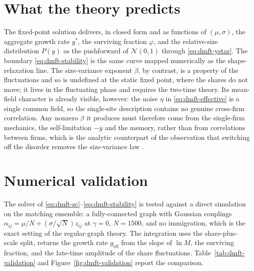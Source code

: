 \section{What the theory predicts}
\label{sec:dmft-observables}

The fixed-point solution delivers, in closed form and as functions of $(\mu,\sigma)$, the
aggregate growth rate $g^\ast$, the surviving fraction $\varphi$, and the relative-size
distribution $P(y)$ as the pushforward of $\mathcal N(0,1)$ through \eqref{eq:dmft-ystar}.
The boundary \eqref{eq:dmft-stability} is the same curve mapped numerically as the
shape-relaxation line. The size-variance exponent $\beta$, by contrast, is a property of
the fluctuations and so is undefined at the static fixed point, where the shares do not
move; it lives in the fluctuating phase and requires the two-time theory. Its mean-field
character is already visible, however: the noise $\eta$ in \eqref{eq:dmft-effective} is a
single common field, so the single-site description contains no genuine cross-firm
correlation. Any nonzero $\beta$ it produces must therefore come from the single-firm
mechanics, the self-limitation $-y$ and the memory, rather than from correlations between
firms, which is the analytic counterpart of the observation that switching off the disorder
removes the size-variance law \citep{moran2024}.

\section{Numerical validation}
\label{sec:dmft-validation}

The solver of \eqref{eq:dmft-sc}--\eqref{eq:dmft-stability} is tested against a direct
simulation on the matching ensemble: a fully-connected graph with Gaussian couplings
$\alpha_{ij} = \mu/N + (\sigma/\sqrt N) z_{ij}$ at $\gamma = 0$, $N = 1500$, and no
immigration, which is the exact setting of the regular-graph theory. The integration uses
the share-plus-scale split, returns the growth rate $g_{\mathrm{eff}}$ from the slope of
$\ln M$, the surviving fraction, and the late-time amplitude of the share fluctuations.
Table~\ref{tab:dmft-validation} and Figure~\ref{fig:dmft-validation} report the comparison.

